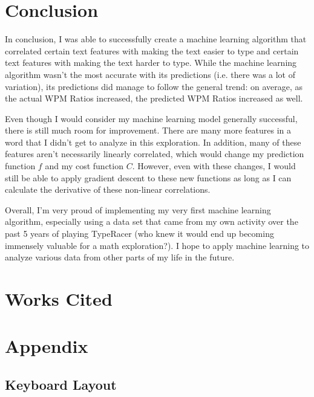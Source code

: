 \documentclass[12pt]{article}
\begin{document}
\section*{Conclusion}

In conclusion, I was able to successfully create a machine learning algorithm that correlated certain text features with making the text easier to type and certain text features with making the text harder to type. While the machine learning algorithm wasn't the most accurate with its predictions (i.e. there was a lot of variation), its predictions did manage to follow the general trend: on average, as the actual WPM Ratios increased, the predicted WPM Ratios increased as well.

Even though I would consider my machine learning model generally successful, there is still much room for improvement. There are many more features in a word that I didn't get to analyze in this exploration. In addition, many of these features aren't necessarily linearly correlated, which would change my prediction function $f$ and my cost function $C$. However, even with these changes, I would still be able to apply gradient descent to these new functions as long as I can calculate the derivative of these non-linear correlations.

Overall, I'm very proud of implementing my very first machine learning algorithm, especially using a data set that came from my own activity over the past 5 years of playing TypeRacer (who knew it would end up becoming immensely valuable for a math exploration?). I hope to apply machine learning to analyze various data from other parts of my life in the future.

\newpage

\section*{Works Cited}

\newpage

\section*{Appendix}

\subsection*{Keyboard Layout}
\end{document}
